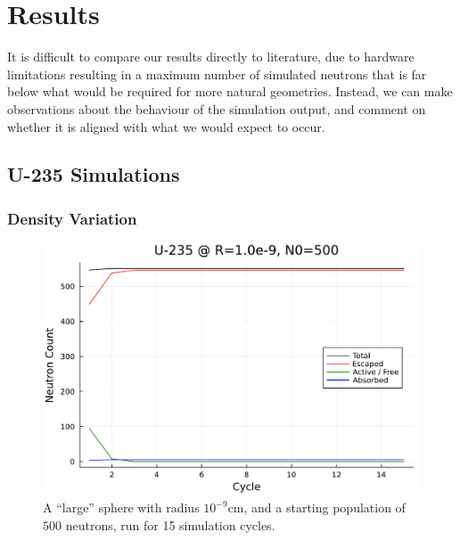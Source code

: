 \section{Results}

It is difficult to compare our results directly to literature, due to hardware limitations resulting in a maximum number of 
simulated neutrons that is far below what would be required for more natural geometries. Instead, we can make observations 
about the behaviour of the simulation output, and comment on whether it is aligned with what we would expect to occur.

\subsection{U-235 Simulations}

\subsubsection{Density Variation}

\begin{figure}[h!]
    \centering
    \includegraphics[scale=0.55]{imgs/neutron-count-uranium-large-sphere.pdf}
    \caption{A ``large'' sphere with radius $10^{-9}$cm, and a starting population of $500$ neutrons, run for 15 simulation 
    cycles.}
\end{figure}

